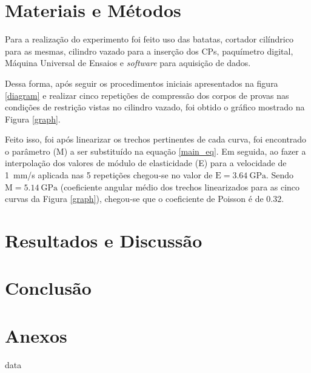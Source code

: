 \documentclass[a4paper, 12pt]{article}
\begin{document}
	\section{Materiais e Métodos}
	
	Para a realização do experimento foi feito uso das batatas, cortador cilíndrico para as mesmas, cilindro vazado para a inserção dos CPs, paquímetro digital, Máquina Universal de Ensaios e \textit{software} para aquisição de dados. 
	
	Dessa forma, após seguir os procedimentos iniciais apresentados na figura \ref{diagram} e realizar cinco repetições de compressão dos corpos de provas nas condições de restrição vistas no cilindro vazado, foi obtido o gráfico mostrado na Figura \ref{graph}.
	
	Feito isso, foi após linearizar os trechos pertinentes de cada curva, foi encontrado o parâmetro (M) a ser substituído na equação \eqref{main_eq}. Em seguida, ao fazer a interpolação dos valores de módulo de elasticidade (E) para a velocidade de \SI{1}{\milli\meter/\second} aplicada nas 5 repetições chegou-se no valor de $\textrm{E}=\SI{3.64}{\giga\pascal}$. Sendo $\textrm{M}=\SI{5.14}{\giga\pascal}$ (coeficiente angular médio dos trechos linearizados para as cinco curvas da Figura \ref{graph}), chegou-se que o coeficiente de Poisson é de $0.32$.
	
	\section{Resultados e Discussão}
	\section{Conclusão}
	
	\section{Anexos}
	
	{data}
	
\end{document}
